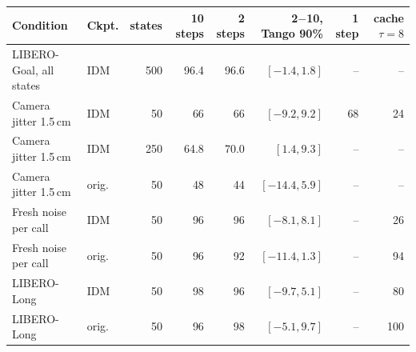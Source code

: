 \begin{tabular}{@{}llrrrrrr@{}}
\toprule
Condition & Ckpt. & states & 10 steps & 2 steps & 2$-$10, Tango 90\% & 1 step & cache $\tau{=}8$ \\
\midrule
LIBERO-Goal, all states & IDM & 500 & 96.4 & 96.6 & $[-1.4, 1.8]$ & -- & -- \\
Camera jitter 1.5\,cm & IDM & 50 & 66 & 66 & $[-9.2, 9.2]$ & 68 & 24 \\
Camera jitter 1.5\,cm & IDM & 250 & 64.8 & 70.0 & $[1.4, 9.3]$ & -- & -- \\
Camera jitter 1.5\,cm & orig. & 50 & 48 & 44 & $[-14.4, 5.9]$ & -- & -- \\
Fresh noise per call & IDM & 50 & 96 & 96 & $[-8.1, 8.1]$ & -- & 26 \\
Fresh noise per call & orig. & 50 & 96 & 92 & $[-11.4, 1.3]$ & -- & 94 \\
LIBERO-Long & IDM & 50 & 98 & 96 & $[-9.7, 5.1]$ & -- & 80 \\
LIBERO-Long & orig. & 50 & 96 & 98 & $[-5.1, 9.7]$ & -- & 100 \\
\bottomrule
\end{tabular}
